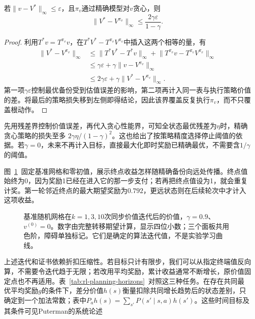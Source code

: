 \begin{theorem}[由价值精度到贪心策略性能]
 \label{thm:rl-planning-greedy-loss}
 若$\lVert v-V^*\rVert_\infty\leq\varepsilon$，且$\pi_v$通过精确模型对$v$贪心，则
 \begin{equation}
 \lVert V^*-V^{\pi_v}\rVert_\infty
 \leq\frac{2\gamma\varepsilon}{1-\gamma}.
 \label{eq:rl-planning-greedy-loss}
 \end{equation}
\end{theorem}
\begin{proof}
 利用$T^*v=T^{\pi_v}v$，在$T^*V^*-T^{\pi_v}V^{\pi_v}$中插入这两个相等的量，有
 \[
 \begin{aligned}
 \lVert V^*-V^{\pi_v}\rVert_\infty
 &\leq\lVert T^*V^*-T^*v\rVert_\infty
       +\lVert T^{\pi_v}v-T^{\pi_v}V^{\pi_v}\rVert_\infty\\
 &\leq\gamma\varepsilon+
       \gamma\lVert v-V^{\pi_v}\rVert_\infty\\
 &\leq2\gamma\varepsilon+
       \gamma\lVert V^*-V^{\pi_v}\rVert_\infty.
 \end{aligned}
 \]
 第一项$\gamma\varepsilon$控制最优备份受到估值误差的影响，第二项再计入同一表与执行策略价值的差。将最后的策略损失移到左侧即得结论，因此该界覆盖反复执行$\pi_v$，而不只覆盖根动作。
\end{proof}

先用残差界控制价值误差，再代入贪心性能界，可知全状态最优残差为$\eta$时，精确贪心策略的损失至多
$2\gamma\eta/(1-\gamma)^2$。这也给出了按策略精度选择停止阈值的依据。若$\gamma=0$，未来不再计入目标，直接最大化即时奖励已精确最优，不需要含$1/\gamma$的阈值。

图~\ref{fig:rl-planning-grid-values}~固定基准网格和零初值，展示终点收益怎样随精确备份向远处传播。终点值始终为0，因为奖励1已经在进入它的那一步支付；若再把终点值设为1，就会重复计奖。第一轮邻近终点的最大期望奖励为$0.792$，更远状态则在后续轮次中才计入这项收益。

\begin{figure}[htbp]
 \centering
 
 \caption{基准随机网格在$k=1,3,10$次同步价值迭代后的价值，$\gamma=0.9$、$v^{(0)}=0$。数字由完整转移期望计算，显示四位小数；三个面板共用色阶，障碍单独标记。它们是确定的算法迭代值，不是实验学习曲线。}
 \label{fig:rl-planning-grid-values}
\end{figure}

上述迭代和证书依赖折扣压缩性。若目标只计有限步，我们可以从指定终端值反向算，不需要令迭代趋于无限；若改用平均奖励，累计收益通常不断增长，原价值固定点也不再适用。表~\ref{tab:rl-planning-horizons}~对照这三种任务。在存在共同最优平均奖励$g$的条件下，差分价值$h(s)$衡量扣除共同增长趋势后的状态差别，只确定到一个加法常数；表中$P_ah(s)=\sum_{s'}P(s'\mid s,a)h(s')$。这些时间目标及其条件可见Puterman的系统论述

